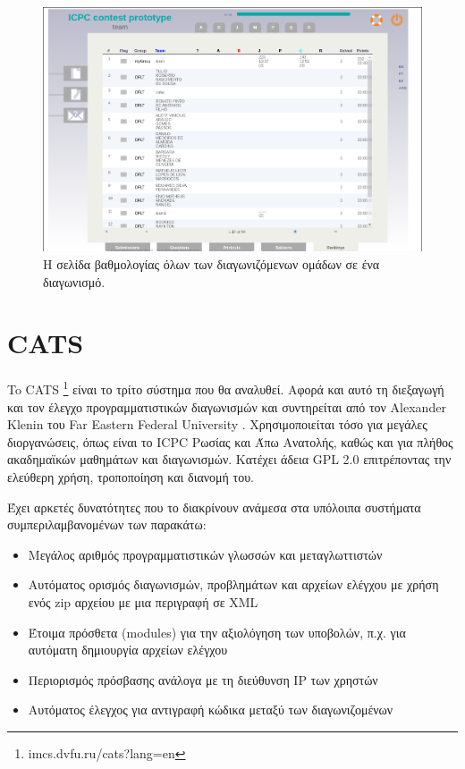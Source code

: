 \documentclass[diploma]{softlab-thesis}
\begin{document}
\begin{figure}
  \centering
  \includegraphics[scale=0.45,trim=4 4 4 4,clip]{Figures/mooshakrankings.png}
  \caption[Σελίδα βαθμολογίας Mooshak]{Η σελίδα βαθμολογίας όλων των διαγωνιζόμενων
  ομάδων σε ένα διαγωνισμό.}
\end{figure}

\FloatBarrier

\section{CATS}

To CATS \footnote{imcs.dvfu.ru/cats?lang=en} είναι το τρίτο σύστημα που θα
αναλυθεί. Αφορά και αυτό τη διεξαγωγή και τον έλεγχο προγραμματιστικών
διαγωνισμών και συντηρείται από τον Alexander Klenin του Far Eastern Federal
University \cite{Rozhkov}. Χρησιμοποιείται τόσο για μεγάλες διοργανώσεις,
όπως είναι το ICPC Ρωσίας και Άπω Ανατολής, καθώς και για πλήθος ακαδημαϊκών
μαθημάτων και διαγωνισμών. Κατέχει άδεια GPL 2.0 επιτρέποντας την ελεύθερη
χρήση, τροποποίηση και διανομή του.

\bigskip

Έχει αρκετές δυνατότητες που το διακρίνουν ανάμεσα στα υπόλοιπα συστήματα
συμπεριλαμβανομένων των παρακάτω:

\begin{itemize}
    \item Μεγάλος αριθμός προγραμματιστικών γλωσσών και μεταγλωττιστών
    \item Αυτόματος ορισμός διαγωνισμών, προβλημάτων και αρχείων ελέγχου με χρήση
      ενός zip αρχείου με μια περιγραφή σε XML
    \item Έτοιμα πρόσθετα (modules) για την αξιολόγηση των υποβολών, π.χ. για
      αυτόματη δημιουργία αρχείων ελέγχου
    \item Περιορισμός πρόσβασης ανάλογα με τη διεύθυνση IP των χρηστών
    \item Αυτόματος έλεγχος για αντιγραφή κώδικα μεταξύ των διαγωνιζομένων
\end{itemize}
\end{document}
